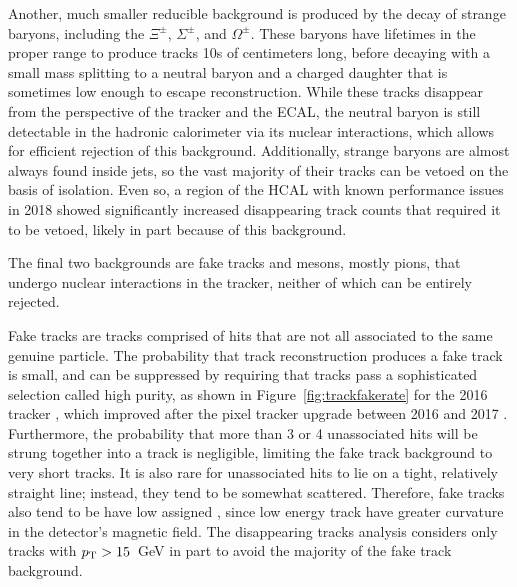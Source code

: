   Another, much smaller reducible background is produced by the decay of strange baryons, including the $\Xi^{\pm}$, $\Sigma^{\pm}$, and $\Omega^{\pm}$.
  These baryons have lifetimes in the proper range to produce tracks 10s of centimeters long, before decaying with a small mass splitting to a neutral baryon and a charged daughter that is sometimes low enough \pt to escape reconstruction.
  While these tracks disappear from the perspective of the tracker and the ECAL, the neutral baryon is still detectable in the hadronic calorimeter via its nuclear interactions, which allows for efficient rejection of this background.
  Additionally, strange baryons are almost always found inside jets, so the vast majority of their tracks can be vetoed on the basis of isolation.
  Even so, a region of the HCAL with known performance issues in 2018 showed significantly increased disappearing track counts that required it to be vetoed, likely in part because of this background.

  The final two backgrounds are fake tracks and mesons, mostly pions, that undergo nuclear interactions in the tracker, neither of which can be entirely rejected.
  
  Fake tracks are tracks comprised of hits that are not all associated to the same genuine particle.
  The probability that track reconstruction produces a fake track is small, and can be suppressed by requiring that tracks pass a sophisticated selection called high purity, as shown in Figure~\ref{fig:trackfakerate} for the 2016 tracker \cite{cmstracking}, which improved after the pixel tracker upgrade between 2016 and 2017 \cite{cmstrackingphase1}.
  Furthermore, the probability that more than 3 or 4 unassociated hits will be strung together into a track is negligible, limiting the fake track background to very short tracks.
  It is also rare for unassociated hits to lie on a tight, relatively straight line; instead, they tend to be somewhat scattered.
  Therefore, fake tracks also tend to be have low assigned \pt, since low energy track have greater curvature in the detector's magnetic field.
  The disappearing tracks analysis considers only tracks with $p_{\mathrm{T}} > 15$~GeV in part to avoid the majority of the fake track background.

